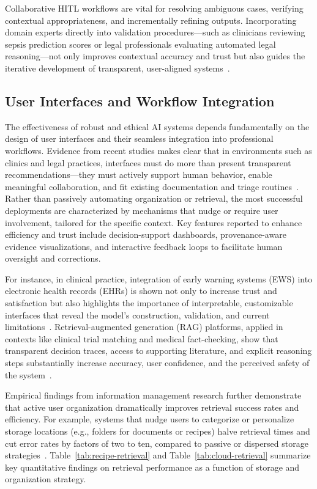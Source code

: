 \documentclass[sigconf]{acmart}
\begin{document}
Collaborative HITL workflows are vital for resolving ambiguous cases, verifying contextual appropriateness, and incrementally refining outputs. Incorporating domain experts directly into validation procedures—such as clinicians reviewing sepsis prediction scores or legal professionals evaluating automated legal reasoning—not only improves contextual accuracy and trust but also guides the iterative development of transparent, user-aligned systems~\cite{ref50,ref54,ref63,ref64}.

\subsection{User Interfaces and Workflow Integration}

The effectiveness of robust and ethical AI systems depends fundamentally on the design of user interfaces and their seamless integration into professional workflows. Evidence from recent studies makes clear that in environments such as clinics and legal practices, interfaces must do more than present transparent recommendations—they must actively support human behavior, enable meaningful collaboration, and fit existing documentation and triage routines~\cite{ref39,ref40,ref41,ref50,ref52,ref53,ref54,ref55,ref63,ref64}. Rather than passively automating organization or retrieval, the most successful deployments are characterized by mechanisms that nudge or require user involvement, tailored for the specific context. Key features reported to enhance efficiency and trust include decision-support dashboards, provenance-aware evidence visualizations, and interactive feedback loops to facilitate human oversight and corrections.

For instance, in clinical practice, integration of early warning systems (EWS) into electronic health records (EHRs) is shown not only to increase trust and satisfaction but also highlights the importance of interpretable, customizable interfaces that reveal the model's construction, validation, and current limitations~\cite{ref50}. Retrieval-augmented generation (RAG) platforms, applied in contexts like clinical trial matching and medical fact-checking, show that transparent decision traces, access to supporting literature, and explicit reasoning steps substantially increase accuracy, user confidence, and the perceived safety of the system~\cite{ref52,ref53,ref54,ref55}.

Empirical findings from information management research further demonstrate that active user organization dramatically improves retrieval success rates and efficiency. For example, systems that nudge users to categorize or personalize storage locations (e.g., folders for documents or recipes) halve retrieval times and cut error rates by factors of two to ten, compared to passive or dispersed storage strategies~\cite{ref39,ref40}. Table~\ref{tab:recipe-retrieval} and Table~\ref{tab:cloud-retrieval} summarize key quantitative findings on retrieval performance as a function of storage and organization strategy.
\end{document}
